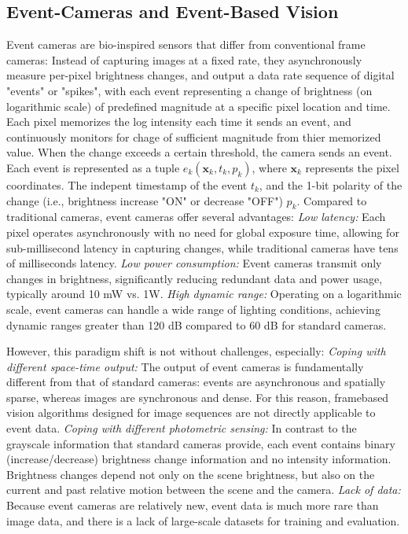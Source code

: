 \documentclass{article}
\begin{document}
\subsection{Event-Cameras and Event-Based Vision}
Event cameras are bio-inspired sensors that differ from conventional frame cameras: Instead of capturing images at a fixed rate, they asynchronously measure per-pixel brightness changes, and output a data rate sequence of digital "events" or "spikes", with each event representing a change of brightness (on logarithmic scale) of predefined magnitude at a specific pixel location and time. Each pixel memorizes the log intensity each time it sends an event, and continuously monitors for chage of sufficient magnitude from thier memorized value. When the change exceeds a certain threshold, the camera sends an event. Each event is represented as a tuple $e_k(\textbf{x}_k,t_k,p_k)$,
where $\textbf{x}_k$ represents the pixel coordinates. The indepent timestamp of the event $t_k$, and the 1-bit polarity of the change (i.e., brightness increase "ON" or decrease "OFF") $p_k$. Compared to traditional cameras, event cameras offer several advantages: \textit{Low latency:} Each pixel operates asynchronously with no need for global exposure time, allowing for sub-millisecond latency in capturing changes, while traditional cameras have tens of milliseconds latency. \textit{Low power consumption:} Event cameras transmit only changes in brightness, significantly reducing redundant data and power usage, typically around 10 mW vs. 1W. \textit{High dynamic range:} Operating on a logarithmic scale, event cameras can handle a wide range of lighting conditions, achieving dynamic ranges greater than 120 dB compared to 60 dB for standard cameras. 

However, this paradigm shift is not without challenges, especially: \textit{Coping with different space-time output:} The output of event cameras is fundamentally different from that of standard cameras: events are asynchronous and spatially sparse, whereas images are synchronous and dense. For this reason, framebased vision algorithms designed for image sequences are not directly applicable to event data. \textit{Coping with different photometric sensing:} In contrast to the grayscale information that standard cameras provide, each event contains binary (increase/decrease) brightness change information and no intensity information. Brightness changes depend not only on the scene brightness, but also on the current and past relative motion between the scene and the camera. \textit{Lack of data:} Because event cameras are relatively new, event data is much more rare than image data, and there is a lack of large-scale datasets for training and evaluation. 
\end{document}
